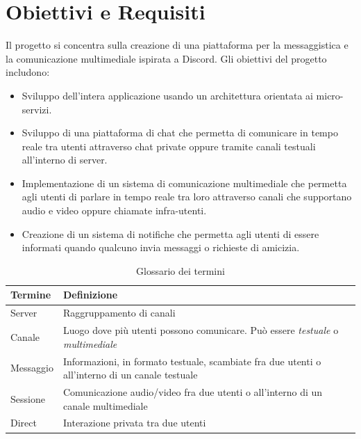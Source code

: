 \section{Obiettivi e Requisiti}

Il progetto si concentra sulla creazione di una piattaforma per la messaggistica e la comunicazione multimediale ispirata a Discord. Gli obiettivi del progetto includono:

\begin{itemize}

    \item Sviluppo dell'intera applicazione usando un architettura orientata ai micro-servizi.

    \item Sviluppo di una piattaforma di chat che permetta di comunicare in tempo reale tra utenti attraverso chat private oppure tramite canali testuali all'interno di server.
    
    \item Implementazione di un sistema di comunicazione multimediale che permetta agli utenti di parlare in tempo reale tra loro attraverso canali che supportano audio e video oppure chiamate infra-utenti.
    
    \item Creazione di un sistema di notifiche che permetta agli utenti di essere informati quando qualcuno invia messaggi o richieste di amicizia.
    
\end{itemize}

\begin{table}[H]
\centering
\begin{tabular}{|l|l|}
\hline
\textbf{Termine} & \textbf{Definizione}                                                                                                                                       \\ \hline
Server           & Raggruppamento di canali                                                                                                                                   \\ \hline
Canale           & Luogo dove più utenti possono comunicare. Può essere \emph{testuale} o \emph{multimediale} \\ \hline
Messaggio        & Informazioni, in formato testuale, scambiate fra due utenti o all'interno di un canale testuale                              \\ \hline
Sessione         & Comunicazione audio/video fra due utenti o all'interno di un canale multimediale                                             \\ \hline
Direct           & Interazione privata tra due utenti                                                                                                                         \\ \hline
\end{tabular}
\caption{Glossario dei termini}
\label{tab:glossario}
\end{table}

